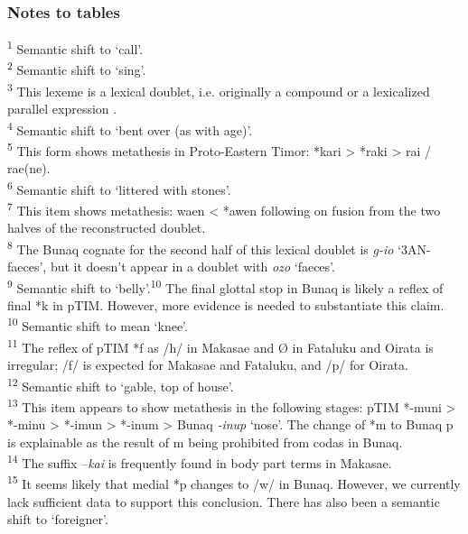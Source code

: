 \documentclass[output=paper]{LSP/langsci}
\begin{document}
\subsubsection{Notes to tables}
\textsuperscript{1} Semantic shift to `call'. 
\\
\textsuperscript{2} Semantic shift to `sing'. 
\\
\textsuperscript{3} This lexeme is a lexical doublet, i.e. originally a compound or a lexicalized parallel expression \citep[see][224]{SchapperEtAl2012:224}. 
\\
\textsuperscript{4} Semantic shift to `bent over (as with age)'. 
\\
\textsuperscript{5} This form shows metathesis in Proto-Eastern Timor: *kari {\textgreater} *raki {\textgreater} ra{\textglotstop}i / ra{\textglotstop}e(ne). 
\\
\textsuperscript{6} Semantic shift to `littered with stones'.
\\
\textsuperscript{7} This item shows metathesis: waen {\textless} *awen following on fusion from the two halves of the reconstructed doublet. 
\\
\textsuperscript{8} The Bunaq cognate for the second half of this lexical doublet is \textit{g-io} `3AN-faeces', but it doesn't appear in a doublet with \textit{ozo} `faeces'. 
\\
\textsuperscript{9} Semantic shift to `belly'.\textsuperscript{10} The final glottal stop in Bunaq is likely a reflex of final *k in pTIM. However, more evidence is needed to substantiate this claim.
\\
\textsuperscript{10} Semantic shift to mean `knee'. 
\\
\textsuperscript{11} The reflex of pTIM *f as /h/ in Makasae and {\O} in Fataluku and Oirata is irregular; /f/ is expected for Makasae and Fataluku, and /p/ for Oirata. 
\\
\textsuperscript{12} Semantic shift to `gable, top of house'. 
\\
\textsuperscript{13} This item appears to show metathesis in the following stages: pTIM *-muni {\textgreater} *-minu {\textgreater} *-imun {\textgreater} *-inum {\textgreater} Bunaq \textit{-inup} `nose'. The change of *m to Bunaq p is explainable as the result of m being prohibited from codas in Bunaq. 
\\
\textsuperscript{14} The suffix --\textit{kai} is frequently found in body part terms in Makasae. 
\\
\textsuperscript{15} It seems likely that medial *p changes to /w/ in Bunaq. However, we currently lack sufficient data to support this conclusion. There has also been a semantic shift to `foreigner'.
\end{document}
